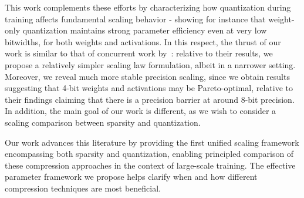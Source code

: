 This work complements these efforts by characterizing how quantization during training affects fundamental scaling behavior - showing for instance that weight-only quantization maintains strong parameter efficiency even at very low bitwidths, for both weights and activations. 
In this respect, the thrust of our work is similar to that of concurrent work by~\citet{kumar2024scaling}: relative to their results, we propose a relatively simpler scaling law formulation, albeit in a narrower setting. Moreover, we reveal much more stable precision scaling, since we obtain results suggesting that 4-bit weights and activations may be Pareto-optimal, relative to their findings claiming that there is a precision barrier at around 8-bit precision. In addition, the main goal of our work is different, as we wish to consider a scaling comparison between sparsity and quantization. 

Our work advances this literature by providing the first unified scaling framework encompassing both sparsity and quantization, enabling principled comparison of these compression approaches in the context of large-scale training. The effective parameter framework we propose helps clarify when and how different compression techniques are most beneficial.